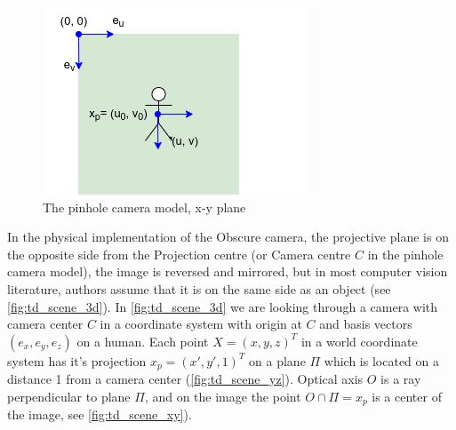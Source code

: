 \begin{figure}[h]
    \centering
    \includegraphics[width=.5\textwidth]{graphics/td_scene_xy.png}
    \caption{The pinhole camera model, x-y plane}
    \label{fig:td_scene_xy}
\end{figure}

In the physical implementation of the Obscure camera, the projective plane is on the opposite side from the Projection centre (or Camera centre $C$ in the pinhole camera model), the image is reversed and mirrored, but in most computer vision literature, authors assume that it is on the same side as an object (see \autoref{fig:td_scene_3d}).
In \autoref{fig:td_scene_3d} we are looking through a camera with camera center $C$ in a coordinate system with origin at $C$ and basis vectors $(e_x, e_y, e_z)$ on a human. 
Each point $X = (x, y, z)^T$ in a world coordinate system has it's projection $x_p = (x', y', 1)^T$ on a plane $\Pi$ which is located on a distance 1 from a camera center (\autoref{fig:td_scene_yz}). 
Optical axis $O$ is a ray perpendicular to plane $\Pi$, and on the image the point $ O \cap \Pi = x_p$ is a center of the image, see \autoref{fig:td_scene_xy}).

